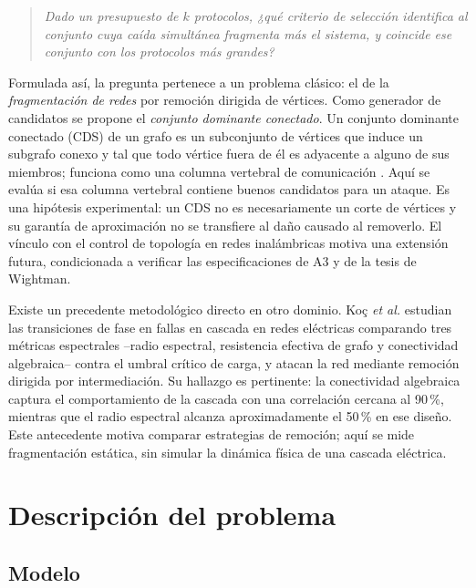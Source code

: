 \documentclass[journal]{IEEEtran}
\begin{document}
\begin{quote}
\emph{Dado un presupuesto de $k$ protocolos, ¿qué criterio de selección
identifica al conjunto cuya caída simultánea fragmenta más el sistema, y
coincide ese conjunto con los protocolos más grandes?}
\end{quote}

Formulada así, la pregunta pertenece a un problema clásico: el de la
\emph{fragmentación de redes} por remoción dirigida de vértices. Como generador
de candidatos se propone el \emph{conjunto dominante conectado}. Un conjunto dominante conectado (CDS) de un grafo es un subconjunto
de vértices que induce un subgrafo conexo y tal que todo vértice fuera de él es
adyacente a alguno de sus miembros; funciona como una columna vertebral de
comunicación \cite{guha1998approximation}. Aquí se evalúa si esa columna vertebral
contiene buenos candidatos para un ataque. Es una hipótesis experimental: un CDS
no es necesariamente un corte de vértices y su garantía de aproximación no se
transfiere al daño causado al removerlo. El vínculo con el control de topología
en redes inalámbricas motiva una extensión futura, condicionada a verificar las
especificaciones de A3 y de la tesis de Wightman.

Existe un precedente metodológico directo en otro dominio. Koç \emph{et al.}
\cite{koc2014topological} estudian las transiciones de fase en fallas en cascada
en redes eléctricas comparando tres métricas espectrales --radio espectral,
resistencia efectiva de grafo y conectividad algebraica-- contra el umbral crítico
de carga, y atacan la red mediante remoción dirigida por intermediación. Su
hallazgo es pertinente: la conectividad algebraica \cite{fiedler1973algebraic}
captura el comportamiento de la cascada con una correlación cercana al 90\,\%,
mientras que el radio espectral alcanza aproximadamente el 50\,\% en ese diseño.
Este antecedente motiva comparar estrategias de remoción; aquí se mide
fragmentación estática, sin simular la dinámica física de una cascada eléctrica.

\section{Descripción del problema}

\subsection{Modelo}
\end{document}

